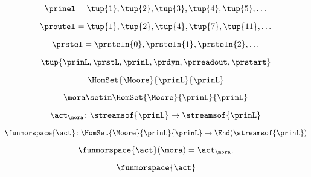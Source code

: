 \begin{forslides}
    \begin{equation}
        \label{eq:slides-processes-14a}
        \prinel = \tup{1}, \tup{2}, \tup{3}, \tup{4}, \tup{5}, \ldots
    \end{equation}
    
     \begin{equation}
        \label{eq:slides-processes-14b}
        \proutel = \tup{1}, \tup{2}, \tup{4}, \tup{7}, \tup{11}, \ldots
    \end{equation}

    \begin{equation}
        \label{eq:slides-processes-15}
        \prstel = \prsteln{0}, \prsteln{1}, \prsteln{2}, \ldots
    \end{equation}

    \begin{equation}
        \label{eq:slides-processes-16}
        \tup{\prinL,\prstL,\prinL,\prdyn,\prreadout,\prstart}
    \end{equation}

    \begin{equation}
        \label{eq:slides-processes-17}
        \HomSet{\Moore}{\prinL}{\prinL}
    \end{equation}

    \begin{equation}
        \label{eq:slides-processes-18}
        \mora \setin \HomSet{\Moore}{\prinL}{\prinL}
    \end{equation}

    \begin{equation}
        \label{eq:slides-processes-19}
        \act_{\mora} \colon \streamsof{\prinL} \to \streamsof{\prinL}
    \end{equation}

    \begin{equation}
        \label{eq:slides-processes-20}
        \funmorspace{\act} \colon  \HomSet{\Moore}{\prinL}{\prinL} \to \End (\streamsof{\prinL})
    \end{equation}

    \begin{equation}
        \label{eq:slides-processes-21}
        \funmorspace{\act}(\mora) = \act_{\mora}.
    \end{equation}

    \begin{equation}
        \label{eq:slides-processes-22}
        \funmorspace{\act}
    \end{equation}


\end{forslides}
